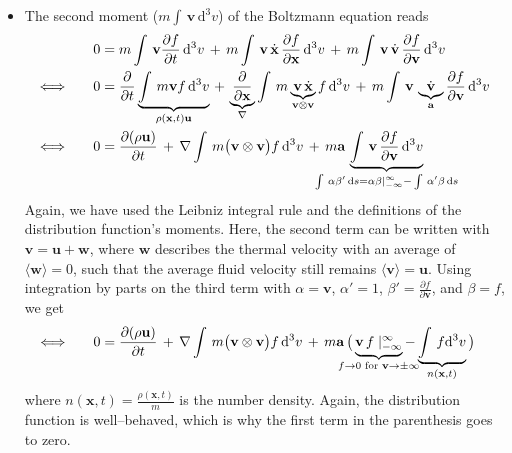 \begin{itemize}
 \item The second moment ($m \int\,\textbf{v}\,\mathrm{d}^{3}v$) of the Boltzmann equation reads
 \begin{align*}
  &0 = m \int\,\textbf{v}\frac{\partial f}{\partial t}\,\mathrm{d}^{3}v \,+\, m \int\,\textbf{v}\,\dot{\textbf{x}}\,\frac{\partial f}{\partial \textbf{x}}\,\mathrm{d}^{3}v \,+\, m \int\,\textbf{v}\,\dot{\textbf{v}}\,\frac{\partial f}{\partial \textbf{v}}\,\mathrm{d}^{3}v \\
  \Longleftrightarrow\qquad
  &0 = \frac{\partial}{\partial t} \underbrace{ \int\,m \textbf{v}f\,\mathrm{d}^{3}v }_{\rho(\textbf{x}, t)\textbf{u}} \,+\, \underbrace{ \frac{\partial}{\partial \textbf{x}} }_{\nabla} \int\,m \underbrace{ \textbf{v}\,\dot{\textbf{x}} }_{\textbf{v}\otimes\textbf{v}} f\,\mathrm{d}^{3}v \,+\, m \int\,\textbf{v}\,\underbrace{ \dot{\textbf{v}} }_{\textbf{a}} \frac{\partial f}{\partial \textbf{v}}\,\mathrm{d}^{3}v \\
  \Longleftrightarrow\qquad
  &0 = \frac{\partial(\rho \textbf{u})}{\partial t} \,+\, \nabla \int\,m \big(\textbf{v}\otimes\textbf{v}\big) f\,\mathrm{d}^{3}v \,+\, m \textbf{a}\,\underbrace{ \int\,\textbf{v}\,\frac{\partial f}{\partial \textbf{v}}\,\mathrm{d}^{3}v }_{\mathclap{\int\,\alpha\beta'\,\mathrm{d}s = \alpha\beta\mid_{-\infty}^{\infty} - \int\,\alpha'\beta\,\mathrm{d}s}}
 \end{align*}
 Again, we have used the Leibniz integral rule and the definitions of the distribution function's moments.
 Here, the second term can be written with $\textbf{v} = \textbf{u} + \textbf{w}$, where $\textbf{w}$ describes the thermal velocity with an average of $\langle \textbf{w}\rangle = 0$, such that the average fluid velocity still remains $\langle \textbf{v}\rangle = \textbf{u}$.
 Using integration by parts on the third term with $\alpha = \textbf{v}$, $\alpha' = 1$, $\beta' = \frac{\partial f}{\partial\textbf{v}}$, and $\beta = f$, we get
 \begin{align*}
 \Longleftrightarrow\qquad
  &0 = \frac{\partial(\rho \textbf{u})}{\partial t} \,+\, \nabla \int\,m \big(\textbf{v}\otimes\textbf{v}\big) f\,\mathrm{d}^{3}v \,+\, m \textbf{a}\,\big(\underbrace{ \textbf{v}\,f\mid_{-\infty}^{\infty} }_{\mathclap{f \rightarrow 0 \text{ for } \textbf{v} \rightarrow \pm \infty}} - \underbrace{ \int\,f\mathrm{d}^{3}v }_{n(\textbf{x}, t)}\big)
 \end{align*}
 where $n(\textbf{x}, t) = \frac{\rho(\textbf{x}, t)}{m}$ is the number density.
 Again, the distribution function is well--behaved, which is why the first term in the parenthesis goes to zero.

\end{itemize}

